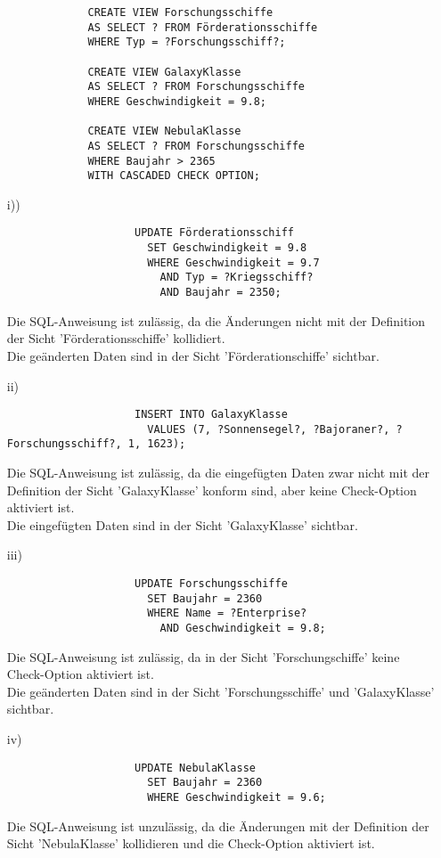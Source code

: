\documentclass[a4paper,11pt,fleqn]{scrartcl}
\begin{document}
\begin{enumerate}
\begin{enumerate}
\begin{verbatim}
				CREATE VIEW Forschungsschiffe
				AS SELECT ? FROM Förderationsschiffe
				WHERE Typ = ?Forschungsschiff?;

				CREATE VIEW GalaxyKlasse
				AS SELECT ? FROM Forschungsschiffe
				WHERE Geschwindigkeit = 9.8;

				CREATE VIEW NebulaKlasse
				AS SELECT ? FROM Forschungsschiffe
				WHERE Baujahr > 2365
				WITH CASCADED CHECK OPTION;
			\end{verbatim}
			
			\begin{enumerate}
				\item[i))] \quad \\
				\begin{verbatim}
					UPDATE Förderationsschiff
					  SET Geschwindigkeit = 9.8
					  WHERE Geschwindigkeit = 9.7
						AND Typ = ?Kriegsschiff?
						AND Baujahr = 2350;
				\end{verbatim}
				Die SQL-Anweisung ist zulässig, da die Änderungen nicht mit der Definition der Sicht 'Förderationsschiffe' kollidiert.\\
				Die geänderten Daten sind in der Sicht 'Förderationschiffe' sichtbar.

				\item[ii)] \quad \\
				\begin{verbatim}
					INSERT INTO GalaxyKlasse
					  VALUES (7, ?Sonnensegel?, ?Bajoraner?, ?Forschungsschiff?, 1, 1623);
				\end{verbatim}
				Die SQL-Anweisung ist zulässig, da die eingefügten Daten zwar nicht mit der Definition der Sicht 'GalaxyKlasse' konform sind, aber keine Check-Option aktiviert ist.\\
				Die eingefügten Daten sind in der Sicht 'GalaxyKlasse' sichtbar.

				\item[iii)] \quad \\
				\begin{verbatim}
					UPDATE Forschungsschiffe
					  SET Baujahr = 2360
					  WHERE Name = ?Enterprise?
						AND Geschwindigkeit = 9.8;
				\end{verbatim}
				Die SQL-Anweisung ist zulässig, da in der Sicht 'Forschungschiffe' keine Check-Option aktiviert ist.\\
				Die geänderten Daten sind in der Sicht 'Forschungsschiffe' und 'GalaxyKlasse' sichtbar.

				\item[iv)] \quad \\
				\begin{verbatim}
					UPDATE NebulaKlasse
					  SET Baujahr = 2360
					  WHERE Geschwindigkeit = 9.6;
				\end{verbatim}
				Die SQL-Anweisung ist unzulässig, da die Änderungen mit der Definition der Sicht 'NebulaKlasse' kollidieren und die Check-Option aktiviert ist.


\end{enumerate}
\end{enumerate}
\end{enumerate}
\end{document}
